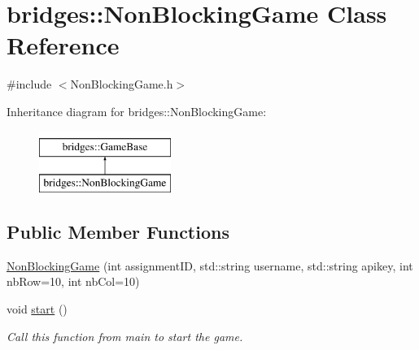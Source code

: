 \hypertarget{classbridges_1_1_non_blocking_game}{}\section{bridges\+:\+:Non\+Blocking\+Game Class Reference}
\label{classbridges_1_1_non_blocking_game}


{\ttfamily \#include $<$Non\+Blocking\+Game.\+h$>$}

Inheritance diagram for bridges\+:\+:Non\+Blocking\+Game\+:\begin{figure}[H]
\begin{center}
\leavevmode
\includegraphics[height=2.000000cm]{classbridges_1_1_non_blocking_game}
\end{center}
\end{figure}
\subsection*{Public Member Functions}
\begin{DoxyCompactItemize}
\item 
\hyperlink{classbridges_1_1_non_blocking_game_a20f86921385a88b6fee3e10484ea444e}{Non\+Blocking\+Game} (int assignment\+ID, std\+::string username, std\+::string apikey, int nb\+Row=10, int nb\+Col=10)
\item 
void \hyperlink{classbridges_1_1_non_blocking_game_acb77c3a60ec27e422e9da8f479214b55}{start} ()
\begin{DoxyCompactList}\small\item\em Call this function from main to start the game. \end{DoxyCompactList}\end{DoxyCompactItemize}
